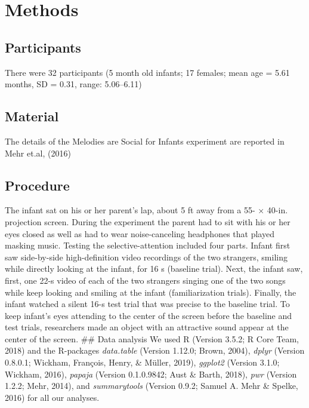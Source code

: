 \documentclass[man]{apa6}
\begin{document}
\section{Methods}\label{methods}

\subsection{Participants}\label{participants}

There were 32 participants (5 month old infants; 17 females; mean age =
5.61 months, SD = 0.31, range: 5.06--6.11)

\subsection{Material}\label{material}

The details of the Melodies are Social for Infants experiment are
reported in Mehr et.al, (2016)

\subsection{Procedure}\label{procedure}

The infant sat on his or her parent's lap, about 5 ft away from a 55- ×
40-in. projection screen. During the experiment the parent had to sit
with his or her eyes closed as well as had to wear noise-canceling
headphones that played masking music. Testing the selective-attention
included four parts. Infant first saw side-by-side high-definition video
recordings of the two strangers, smiling while directly looking at the
infant, for 16 s (baseline trial). Next, the infant saw, first, one 22-s
video of each of the two strangers singing one of the two songs while
keep looking and smiling at the infant (familiarization trials).
Finally, the infant watched a silent 16-s test trial that was precise to
the baseline trial. To keep infant's eyes attending to the center of the
screen before the baseline and test trials, researchers made an object
with an attractive sound appear at the center of the screen. \#\# Data
analysis We used R (Version 3.5.2; R Core Team, 2018) and the R-packages
\emph{data.table} (Version 1.12.0; Brown, 2004), \emph{dplyr} (Version
0.8.0.1; Wickham, François, Henry, \& Müller, 2019), \emph{ggplot2}
(Version 3.1.0; Wickham, 2016), \emph{papaja} (Version 0.1.0.9842; Aust
\& Barth, 2018), \emph{pwr} (Version 1.2.2; Mehr, 2014), and
\emph{summarytools} (Version 0.9.2; Samuel A. Mehr \& Spelke, 2016) for
all our analyses.
\end{document}

